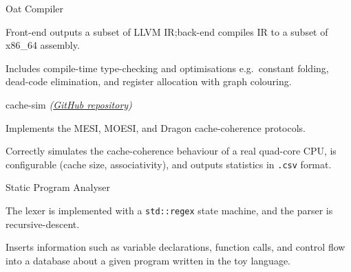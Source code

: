 \begin{cventries}
	{Oat Compiler} %
	{} %
	{} %
	{
		\begin{cvitems} %
			\item Front-end outputs a subset of LLVM IR;\@ back-end compiles IR to a subset of x86\_64 assembly.
			\item Includes compile-time type-checking and optimisations e.g.\ constant folding, dead-code elimination, and register allocation with graph colouring.
		\end{cvitems}
	}


	{cache-sim \emph{\tiny(\href{https://github.com/sharadhr/cs4223-cache-sim}{GitHub repository})}} %
	{} %
	{} %
	{
		\begin{cvitems} %
			\item Implements the MESI, MOESI, and Dragon cache-coherence protocols.
			\item Correctly simulates the cache-coherence behaviour of a real quad-core CPU, is configurable (cache size, associativity), and outputs statistics in \texttt{.csv} format.
		\end{cvitems}
	}


	{Static Program Analyser} %
	{} %
	{} %
	{
		\begin{cvitems} %
			\item The lexer is implemented with a \texttt{std::regex} state machine, and the parser is recursive-descent.
			\item Inserts information such as variable declarations, function calls, and control flow into a database about a given program written in the toy language.
		\end{cvitems}
	}

\end{cventries}

